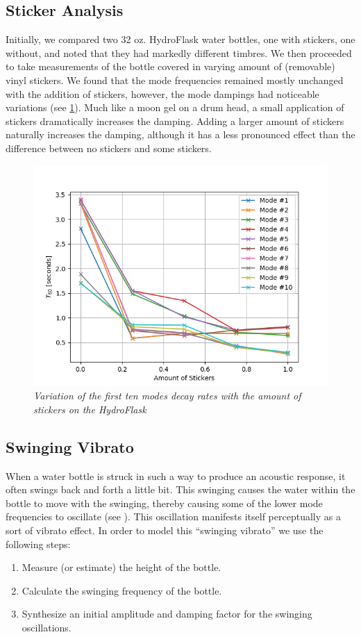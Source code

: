 \documentclass[twoside,a4paper]{article}
\begin{document}
\subsection{Sticker Analysis} \label{sec:sticker}
%
Initially, we compared two 32 oz. HydroFlask water bottles, one
with stickers, one without, and noted that they had markedly different
timbres. We then proceeded to take measurements of the
bottle covered in varying amount of (removable) vinyl stickers. We found
that the mode frequencies remained mostly unchanged with the
addition of stickers, however, the mode dampings had noticeable
variations (see \cref{fig:sticker-mode-damp}). Much like a moon gel on a drum head, a small application of stickers dramatically increases the damping. Adding a larger amount of stickers naturally increases the damping, although it has a less pronounced effect than the difference between no stickers and some stickers. 
%
\begin{figure}[!htb]
    \centering
    \includegraphics[width=\linewidth,trim={0 0 1cm 1cm},clip]{../Figures/StickerDamping}
    \caption{\it{Variation of the first ten modes decay rates
                 with the amount of stickers on the HydroFlask}}
    \label{fig:sticker-mode-damp}
\end{figure}
%
\subsection{Swinging Vibrato} \label{sec:swing}
%
When a water bottle is struck in such a way to produce an acoustic
response, it often swings back and forth a little bit. This swinging
causes the water within the bottle to move with the swinging, thereby
causing some of the lower mode frequencies to oscillate (see
). This oscillation
manifests itself perceptually as a sort of vibrato effect. In
order to model this ``swinging vibrato'' we use the following
steps:
\begin{enumerate}
    \item Measure (or estimate) the height of the bottle.
    \item Calculate the swinging frequency of the bottle.
    \item Synthesize an initial amplitude and damping factor
        for the swinging oscillations.
\end{enumerate}
%
\end{document}
